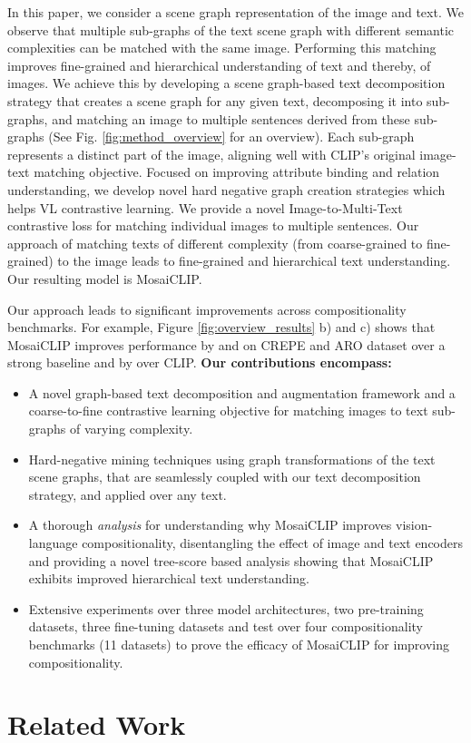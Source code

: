 \documentclass[11pt]{article}
\newcommand{\methodcomp}{MosaiCLIP}
\begin{document}
In this paper, we consider a scene graph representation of the image and text. We observe that multiple sub-graphs of the text scene graph with different semantic complexities can be matched with the same image. Performing this matching improves fine-grained and hierarchical understanding of text and thereby, of images. 
We achieve this by developing a scene graph-based text decomposition strategy that creates a scene graph for any given text, decomposing it into sub-graphs, and matching an image to multiple sentences derived from these sub-graphs (See Fig. \ref{fig:method_overview} for an overview). Each sub-graph represents a distinct part of the image, aligning well with CLIP's original image-text matching objective. Focused on improving {attribute binding} and {relation understanding}, we develop novel hard negative graph creation strategies which helps VL contrastive learning.
We provide a novel Image-to-Multi-Text contrastive loss for matching individual images to multiple sentences. Our approach of matching texts of different complexity (from coarse-grained to fine-grained) to the image leads to fine-grained and hierarchical text understanding. Our resulting model is \methodcomp{}.

Our approach leads to significant improvements across compositionality benchmarks. For example, Figure \ref{fig:overview_results} b) and c) shows that MosaiCLIP improves performance by  and  on CREPE and ARO dataset over a strong baseline and by  over CLIP. \textbf{Our contributions encompass:}
\begin{itemize}\item A novel graph-based text decomposition and augmentation framework and a coarse-to-fine contrastive learning objective for matching images to text sub-graphs of varying complexity.
    \item Hard-negative mining techniques using graph transformations of the text scene graphs, that are seamlessly coupled with our text decomposition strategy, and applied over any text. 
    \item A thorough \textit{analysis} for understanding why \methodcomp{} improves vision-language compositionality, disentangling the effect of image and text encoders and providing a novel tree-score based analysis showing that \methodcomp{} exhibits improved hierarchical text understanding.
    \item Extensive experiments over three model architectures, two pre-training datasets, three fine-tuning datasets and test over four compositionality benchmarks (11 datasets) to prove the efficacy of \methodcomp{} for improving compositionality.
\end{itemize} \section{Related Work}
\label{sec_related}
\end{document}
